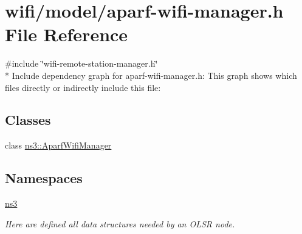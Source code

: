 \hypertarget{aparf-wifi-manager_8h}{}\section{wifi/model/aparf-\/wifi-\/manager.h File Reference}
\label{aparf-wifi-manager_8h}
{\ttfamily \#include \char`\"{}wifi-\/remote-\/station-\/manager.\+h\char`\"{}}\\*
Include dependency graph for aparf-\/wifi-\/manager.h\+:
This graph shows which files directly or indirectly include this file\+:
\subsection*{Classes}
\begin{DoxyCompactItemize}
\item 
class \hyperlink{classns3_1_1AparfWifiManager}{ns3\+::\+Aparf\+Wifi\+Manager}
\end{DoxyCompactItemize}
\subsection*{Namespaces}
\begin{DoxyCompactItemize}
\item 
 \hyperlink{namespacens3}{ns3}
\begin{DoxyCompactList}\small\item\em Here are defined all data structures needed by an O\+L\+SR node. \end{DoxyCompactList}\end{DoxyCompactItemize}
